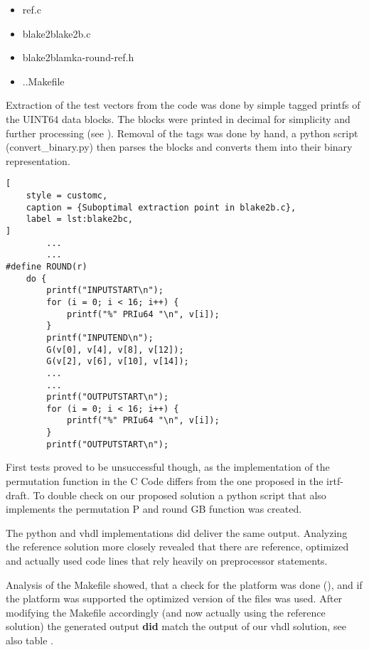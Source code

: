 \begin{itemize}
\item ref.c
\item blake2blake2b.c
\item blake2blamka-round-ref.h
\item ..Makefile
\end{itemize}


Extraction of the test vectors from the code was done by simple tagged printfs
of the UINT64 data blocks. The blocks were printed in decimal for simplicity and further
processing (see ). Removal of the tags was done by hand, a python script (convert_binary.py) then parses the blocks and converts them into their binary representation.

\begin{lstlisting}[
	style = customc,
	caption = {Suboptimal extraction point in blake2b.c},
	label = lst:blake2bc,
]
		...
		...
#define ROUND(r)                       	
    do {                                	
		printf("INPUTSTART\n");			   	
		for (i = 0; i < 16; i++) {		   	
			printf("%" PRIu64 "\n", v[i]); 	
		}								   	
		printf("INPUTEND\n");			   	
		G(v[0], v[4], v[8], v[12]);        
		G(v[2], v[6], v[10], v[14]);    
		...
		...
		printf("OUTPUTSTART\n");			   	
		for (i = 0; i < 16; i++) {		   	
			printf("%" PRIu64 "\n", v[i]); 	
		}								   	
		printf("OUTPUTSTART\n");			   	

\end{lstlisting}

First tests proved to be unsuccessful though, as the implementation of the permutation
function in the C Code differs from the one proposed in the irtf-draft\autocite{irtf-draft}.
To double check on our proposed solution a python script that also implements the
permutation P and round GB function was created.

The python and vhdl implementations did deliver the same output. Analyzing the reference
solution more closely revealed that there are reference, optimized and actually used code
lines that rely heavily on preprocessor statements. 

Analysis of the Makefile showed, that a check for the platform was done (), and if the
platform was supported the optimized version of the files was used.
After modifying the Makefile accordingly (and now actually using the reference solution)
the generated output \textbf{did} match the output of our vhdl solution, see also table
.

